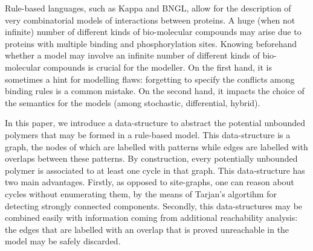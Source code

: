 Rule-based languages, such as Kappa and BNGL, allow for the description of very combinatorial models of interactions between proteins. A huge (when not infinite) number of different kinds of bio-molecular compounds may arise
 due to proteins with multiple binding and phosphorylation sites. Knowing beforehand whether a model may involve an infinite number of different kinds of bio-molecular compounds is crucial for the modeller. On the first hand, it is sometimes a hint for modelling flaws: forgetting to specify
the conflicts among binding rules is a common mistake. On the second hand,
it impacts the choice of  the semantics for the models (among stochastic, differential, hybrid).

In this paper, we introduce a data-structure to abstract the potential unbounded polymers that may be formed in a rule-based model. This data-structure is a graph, the nodes of which are labelled with patterns while edges are labelled with overlaps between these patterns. %
By construction,  every potentially unbounded polymer is associated to at least one cycle in that graph. This data-structure has two main advantages. Firstly, as opposed to site-graphs, one can reason about cycles without enumerating them, by the means of Tarjan's algortihm for detecting strongly connected components. Secondly, this data-structures may be combined easily with information coming from additional reachability analysis:
the edges that are labelled with an overlap that is proved unreachable in the model may be safely discarded.
